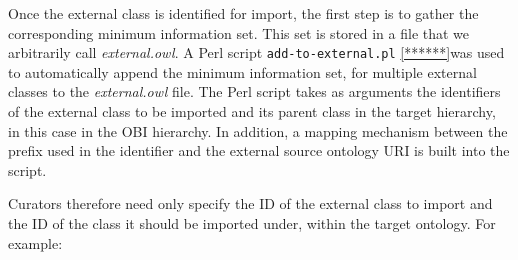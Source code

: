 \documentclass[a4paper,10pt,twocolumn]{article}
\newcommand{\protege}{Prot\'{e}g\'{e}}
\begin{document}

Once the external class is identified for import, the first step is to gather the corresponding minimum information set.
This set is stored in a file that we arbitrarily call \emph{external.owl}.
A Perl script \texttt{add-to-external.pl} \ref{******}was used to automatically append the minimum information set, for multiple external classes to the \emph{external.owl} file. The Perl script takes as arguments the identifiers of the external class to be imported and its parent class in the target hierarchy, in this case in the \ac{OBI} hierarchy. 
In addition, a mapping mechanism between the prefix used in the identifier and the external source ontology URI is built into the script.







Curators therefore need only specify the ID of the external class to import and the ID of the class it should be imported under, within the target ontology.
For example:
\end{document}

